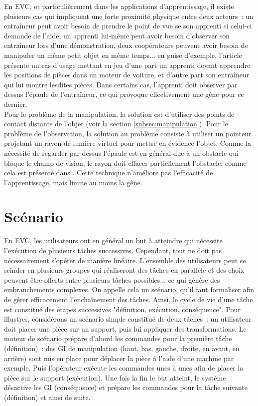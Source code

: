 \documentclass[11pt]{article}
\begin{document}
En EVC, et particulièrement dans les applications d'apprentissage, il existe plusieurs cas qui impliquent une forte proximité physique entre deux acteurs~: un entraîneur peut avoir besoin de prendre le point de vue se son apprenti si celui-ci demande de l'aide, un apprenti lui-même peut avoir besoin d'observer son entraîneur lors d'une démonstration, deux coopérateurs peuvent avoir besoin de manipuler un même petit objet en même temps... en guise d'exemple, l'article \cite{show-through} présente un cas d'usage mettant en jeu d'une part un apprenti devant apprendre les positions de pièces dans un moteur de voiture, et d'autre part son entraîneur qui lui montre lesdites pièces. Dans certains cas, l'apprenti doit observer par dessus l'épaule de l'entraîneur, ce qui provoque effectivement une gêne pour ce dernier.
\\

Pour le problème de la manipulation, la solution est d'utiliser des points de contact distants de l'objet (voir la section \ref{subsec:manipulation}). Pour le problème de l'observation, la solution au problème consiste à utiliser un pointeur projetant un rayon de lumière virtuel pour mettre en évidence l'objet. Comme la nécessité de regarder par dessus l'épaule est en général due à un obstacle qui bloque le champ de vision, le rayon doit effacer partiellement l'obstacle, comme cela est présenté dans \cite{show-through}. Cette technique n'améliore pas l'efficacité de l'apprentissage, mais limite au moins la gêne.

\section{Scénario}
En EVC, les utilisateurs ont en général un but à atteindre qui nécessite l'exécution de plusieurs tâches successives. Cependant, tout ne doit pas nécessairement s'opérer de manière linéaire. L'ensemble des utilisateurs peut se scinder en plusieurs groupes qui réaliseront des tâches en parallèle et des choix peuvent être offerts entre plusieurs tâches possibles... ce qui génère des embranchements complexes. On appelle cela un scénario, qu'il faut formaliser afin de gérer efficacement l'enchaînement des tâches. Ainsi, le cycle de vie d'une tâche est constitué des étapes successives "définition, exécution, conséquence". Pour illustrer, considérons un scénario simple constitué de deux tâches~: un utilisateur doit placer une pièce sur un support, puis lui appliquer des transformations. Le moteur de scénario prépare d'abord les commandes pour la première tâche (définition)~: des GI de manipulation (haut, bas, gauche, droite, en avant, en arrière) sont mis en place pour déplacer la pièce à l'aide d'une machine par exemple. Puis l'opérateur exécute les commandes unes à unes afin de placer la pièce sur le support (exécution). Une fois la fin le but atteint, le système désactive les GI (conséquence) et prépare les commandes pour la tâche suivante (définition) et ainsi de suite.
\\
\end{document}
